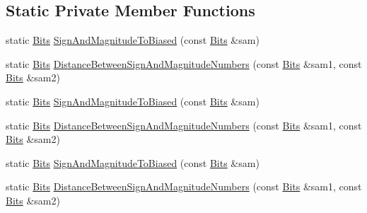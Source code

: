 \subsection*{Static Private Member Functions}
\begin{DoxyCompactItemize}
\item 
static \mbox{\hyperlink{classtesting_1_1internal_1_1_floating_point_abf228bf6cd48f12c8b44c85b4971a731}{Bits}} \mbox{\hyperlink{classtesting_1_1internal_1_1_floating_point_a2cf0e39c6ebf026bc0353100d031ca85}{Sign\+And\+Magnitude\+To\+Biased}} (const \mbox{\hyperlink{classtesting_1_1internal_1_1_floating_point_abf228bf6cd48f12c8b44c85b4971a731}{Bits}} \&sam)
\item 
static \mbox{\hyperlink{classtesting_1_1internal_1_1_floating_point_abf228bf6cd48f12c8b44c85b4971a731}{Bits}} \mbox{\hyperlink{classtesting_1_1internal_1_1_floating_point_afe00f9f26ad2929a061f7e07b8a5071a}{Distance\+Between\+Sign\+And\+Magnitude\+Numbers}} (const \mbox{\hyperlink{classtesting_1_1internal_1_1_floating_point_abf228bf6cd48f12c8b44c85b4971a731}{Bits}} \&sam1, const \mbox{\hyperlink{classtesting_1_1internal_1_1_floating_point_abf228bf6cd48f12c8b44c85b4971a731}{Bits}} \&sam2)
\item 
static \mbox{\hyperlink{classtesting_1_1internal_1_1_floating_point_abf228bf6cd48f12c8b44c85b4971a731}{Bits}} \mbox{\hyperlink{classtesting_1_1internal_1_1_floating_point_a2cf0e39c6ebf026bc0353100d031ca85}{Sign\+And\+Magnitude\+To\+Biased}} (const \mbox{\hyperlink{classtesting_1_1internal_1_1_floating_point_abf228bf6cd48f12c8b44c85b4971a731}{Bits}} \&sam)
\item 
static \mbox{\hyperlink{classtesting_1_1internal_1_1_floating_point_abf228bf6cd48f12c8b44c85b4971a731}{Bits}} \mbox{\hyperlink{classtesting_1_1internal_1_1_floating_point_afe00f9f26ad2929a061f7e07b8a5071a}{Distance\+Between\+Sign\+And\+Magnitude\+Numbers}} (const \mbox{\hyperlink{classtesting_1_1internal_1_1_floating_point_abf228bf6cd48f12c8b44c85b4971a731}{Bits}} \&sam1, const \mbox{\hyperlink{classtesting_1_1internal_1_1_floating_point_abf228bf6cd48f12c8b44c85b4971a731}{Bits}} \&sam2)
\item 
static \mbox{\hyperlink{classtesting_1_1internal_1_1_floating_point_abf228bf6cd48f12c8b44c85b4971a731}{Bits}} \mbox{\hyperlink{classtesting_1_1internal_1_1_floating_point_a2cf0e39c6ebf026bc0353100d031ca85}{Sign\+And\+Magnitude\+To\+Biased}} (const \mbox{\hyperlink{classtesting_1_1internal_1_1_floating_point_abf228bf6cd48f12c8b44c85b4971a731}{Bits}} \&sam)
\item 
static \mbox{\hyperlink{classtesting_1_1internal_1_1_floating_point_abf228bf6cd48f12c8b44c85b4971a731}{Bits}} \mbox{\hyperlink{classtesting_1_1internal_1_1_floating_point_afe00f9f26ad2929a061f7e07b8a5071a}{Distance\+Between\+Sign\+And\+Magnitude\+Numbers}} (const \mbox{\hyperlink{classtesting_1_1internal_1_1_floating_point_abf228bf6cd48f12c8b44c85b4971a731}{Bits}} \&sam1, const \mbox{\hyperlink{classtesting_1_1internal_1_1_floating_point_abf228bf6cd48f12c8b44c85b4971a731}{Bits}} \&sam2)
\end{DoxyCompactItemize}
